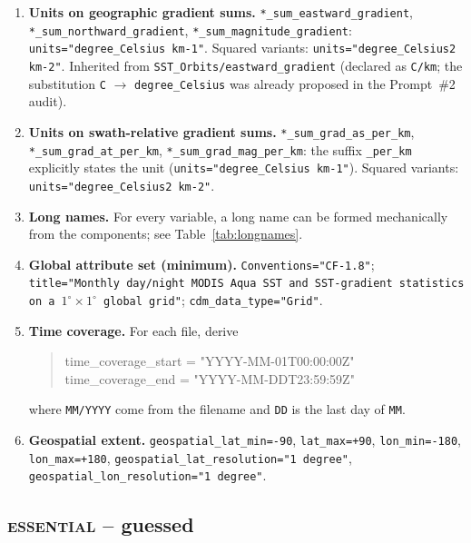 \documentclass[11pt]{article}
\newcommand{\gs}{\textbf{guessed}}
\newcommand{\es}{\textsc{essential}}
\begin{document}
\begin{enumerate}
  \item \textbf{Units on geographic gradient sums.}
    \texttt{*\_sum\_eastward\_gradient},
    \texttt{*\_sum\_northward\_gradient},
    \texttt{*\_sum\_magnitude\_gradient}:
    \texttt{units="degree\_Celsius km-1"}. Squared variants:
    \texttt{units="degree\_Celsius2 km-2"}. Inherited from
    \texttt{SST\_Orbits/eastward\_gradient} (declared as
    \texttt{C/km}; the substitution
    \texttt{C} $\to$ \texttt{degree\_Celsius} was already proposed
    in the Prompt~\#2 audit).

  \item \textbf{Units on swath-relative gradient sums.}
    \texttt{*\_sum\_grad\_as\_per\_km},
    \texttt{*\_sum\_grad\_at\_per\_km},
    \texttt{*\_sum\_grad\_mag\_per\_km}: the suffix
    \texttt{\_per\_km} explicitly states the unit
    (\texttt{units="degree\_Celsius km-1"}). Squared variants:
    \texttt{units="degree\_Celsius2 km-2"}.

  \item \textbf{Long names.} For every variable, a long name can be
    formed mechanically from the components; see
    Table~\ref{tab:longnames}.

  \item \textbf{Global attribute set (minimum).}
    \texttt{Conventions="CF-1.8"};
    \texttt{title="Monthly day/night MODIS Aqua SST and SST-gradient
    statistics on a $1^\circ\times 1^\circ$ global grid"};
    \texttt{cdm\_data\_type="Grid"}.

  \item \textbf{Time coverage.} For each file, derive
    \begin{quote}\ttfamily
      time\_coverage\_start = "YYYY-MM-01T00:00:00Z" \\
      time\_coverage\_end   = "YYYY-MM-DDT23:59:59Z"
    \end{quote}
    where \texttt{MM/YYYY} come from the filename and
    \texttt{DD} is the last day of \texttt{MM}.

  \item \textbf{Geospatial extent.}
    \texttt{geospatial\_lat\_min=-90}, \texttt{lat\_max=+90},
    \texttt{lon\_min=-180}, \texttt{lon\_max=+180},
    \texttt{geospatial\_lat\_resolution="1 degree"},
    \texttt{geospatial\_lon\_resolution="1 degree"}.
\end{enumerate}

\subsection{\es{} -- \gs{}}\label{sec:es-gs}
\end{document}
